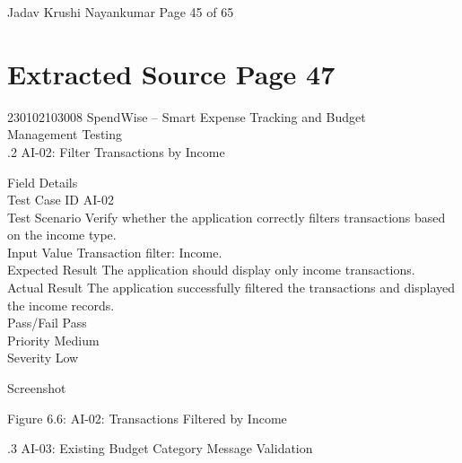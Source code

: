 \documentclass[12pt,a4paper]{report}
\begin{document}
\smallskip

\smallskip

\smallskip

\smallskip
Jadav Krushi Nayankumar                                                      Page 45 of 65\\ 

\clearpage
\section*{Extracted Source Page 47}
230102103008                       SpendWise – Smart Expense Tracking and Budget\\ 
Management Testing\\ 

.2 AI-02: Filter Transactions by Income\\ 

\smallskip

\smallskip
Field                  Details\\ 
Test Case ID           AI-02\\ 
Test Scenario          Verify whether the application correctly filters transactions based\\ 
on the income type.\\ 
Input Value            Transaction filter: Income.\\ 
Expected Result        The application should display only income transactions.\\ 
Actual Result          The application successfully filtered the transactions and displayed\\ 
the income records.\\ 
Pass/Fail              Pass\\ 
Priority               Medium\\ 
Severity               Low\\ 

\smallskip

\smallskip
Screenshot\\ 

\smallskip

\smallskip

\smallskip

\smallskip
Figure 6.6: AI-02: Transactions Filtered by Income\\ 

\smallskip

\smallskip

.3 AI-03: Existing Budget Category Message Validation\\ 
\end{document}
